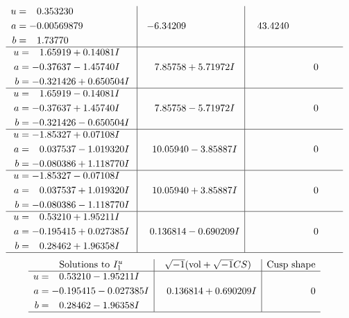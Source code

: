 \documentclass[1p]{elsarticle_modified}
\theoremstyle{definition}
\newcommand{\I}{\sqrt{-1}}
\begin{document}
$$\begin{array}{c|c|c}
\begin{aligned}
u &= \phantom{-}0.353230\phantom{ +0.000000I} \\
a &= -0.00569879\phantom{ +0.000000I} \\
b &= \phantom{-}1.73770\phantom{ +0.000000I}\end{aligned}
 & -6.34209\phantom{ +0.000000I} & \phantom{-}43.4240\phantom{ +0.000000I} \\ \hline\begin{aligned}
u &= \phantom{-}1.65919 + 0.14081 I \\
a &= -0.37637 - 1.45740 I \\
b &= -0.321426 + 0.650504 I\end{aligned}
 & \phantom{-}7.85758 + 5.71972 I & \phantom{-0.000000 } 0 \\ \hline\begin{aligned}
u &= \phantom{-}1.65919 - 0.14081 I \\
a &= -0.37637 + 1.45740 I \\
b &= -0.321426 - 0.650504 I\end{aligned}
 & \phantom{-}7.85758 - 5.71972 I & \phantom{-0.000000 } 0 \\ \hline\begin{aligned}
u &= -1.85327 + 0.07108 I \\
a &= \phantom{-}0.037537 - 1.019320 I \\
b &= -0.080386 + 1.118770 I\end{aligned}
 & \phantom{-}10.05940 - 3.85887 I & \phantom{-0.000000 } 0 \\ \hline\begin{aligned}
u &= -1.85327 - 0.07108 I \\
a &= \phantom{-}0.037537 + 1.019320 I \\
b &= -0.080386 - 1.118770 I\end{aligned}
 & \phantom{-}10.05940 + 3.85887 I & \phantom{-0.000000 } 0 \\ \hline\begin{aligned}
u &= \phantom{-}0.53210 + 1.95211 I \\
a &= -0.195415 + 0.027385 I \\
b &= \phantom{-}0.28462 + 1.96358 I\end{aligned}
 & \phantom{-}0.136814 - 0.690209 I & \phantom{-0.000000 } 0\\
 \hline 
 \end{array}$$\newpage$$\begin{array}{c|c|c}  
\text{Solutions to }I^u_{1}& \I (\text{vol} + \sqrt{-1}CS) & \text{Cusp shape}\\
 \hline 
\begin{aligned}
u &= \phantom{-}0.53210 - 1.95211 I \\
a &= -0.195415 - 0.027385 I \\
b &= \phantom{-}0.28462 - 1.96358 I\end{aligned}
 & \phantom{-}0.136814 + 0.690209 I & \phantom{-0.000000 } 0\\
 \hline 
 \end{array}$$\newpage\newpage\renewcommand{\arraystretch}{1}
\end{document}
